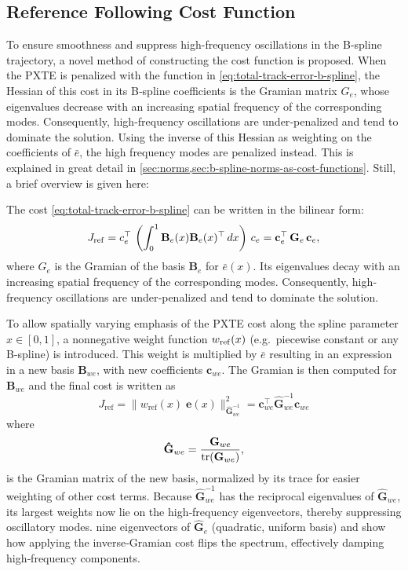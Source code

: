 \subsection{Reference Following Cost Function}\label{sec:oscillations}
To ensure smoothness and suppress high-frequency oscillations in the B-spline trajectory, a novel method of constructing the cost function is proposed.
When the PXTE is penalized with the function in \cref{eq:total-track-error-b-spline}, 
the Hessian of this cost in its B‐spline coefficients is the Gramian matrix $G_e$, whose eigenvalues decrease with an increasing spatial frequency of the corresponding modes.  Consequently, high‐frequency oscillations are under‐penalized and tend to dominate the solution. Using the inverse of this Hessian as weighting on the coefficients of $\bar e$, the high frequency modes are penalized instead. This is explained in great detail in \cref{sec:norms,sec:b-spline-norms-as-cost-functions}. Still, a brief overview is given here:

The cost \cref{eq:total-track-error-b-spline} can be written in the bilinear form:
\begin{equation}\label{eq:cost-reference-following-bilinear}
  J_{\rm ref} = c_e^\top\,\left(\int_0^1 \mathbf B_e(x) \mathbf B_e(x)^\top \, dx\right)\,c_e =
  \mathbf c_e^\top\,\mathbf G_e\, \mathbf c_e,
\end{equation}
where \(G_e\) is the Gramian of the basis $\mathbf B_e$ for \(\bar e(x)\). Its eigenvalues decay with an increasing spatial frequency of the corresponding modes. Consequently, high‐frequency oscillations are under‐penalized and tend to dominate the solution.

To allow spatially varying emphasis of the PXTE cost along the spline parameter $x\in[0,1]$, a nonnegative weight function $w_{\rm ref}(x)$ (e.g.\ piecewise constant or any B-spline) is introduced. This weight is multiplied by $\bar e$ resulting in an expression in a new basis $\mathbf B_{we}$, with new coefficients $\mathbf c_{we}$. The Gramian is then computed for $\mathbf B_{we}$ and the final cost is written as
\begin{equation}\label{eq:cost-reference-following-gramian}
    J_\text{ref} = \|w_\text{ref}(x)\;\mathbf e(x)\|_{\mathbf{\hat G}_{we}^{-1}}^2 
    = \mathbf{c}_{we}^\top \mathbf{\hat G}_{we}^{-1} \mathbf{c}_{we}
\end{equation}
where
\begin{equation}\label{eq:gramian-density}
    \mathbf{\hat G}_{we} = \frac{\mathbf G_{we}}{\operatorname{tr}(\mathbf G_{we})}, 
\end{equation}
is the Gramian matrix of the new basis, normalized by its trace for easier weighting of other cost terms. 
Because $\mathbf{\hat G}_{we}^{-1}$ has the reciprocal eigenvalues of $\mathbf{\hat G}_{we}$, its largest weights now lie on the high‐frequency eigenvectors, thereby suppressing oscillatory modes.  nine eigenvectors of $\mathbf{\hat G}_e$ (quadratic, uniform basis) and show how applying the inverse‐Gramian cost flips the spectrum, effectively damping high‐frequency components.



